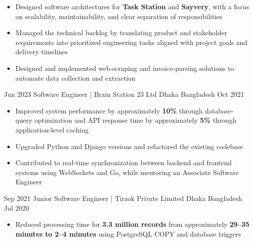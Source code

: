 \begin{experiences}
{\begin{itemize}
                \item Designed software architectures for \textbf{Task Station} and \textbf{Sayvery}, 
                      with a focus on scalability, maintainability, and clear separation of responsibilities

                \item Managed the technical backlog by translating product and
                      stakeholder requirements into prioritized engineering tasks
                      aligned with project goals and delivery timelines

                \item Designed and implemented web-scraping and invoice-parsing
                      solutions to automate data collection and extraction
            \end{itemize}
        }
        {}

    \emptySeparator


    \experience
        {Jun 2023}
        {Software Engineer | Brain Station 23 Ltd}
        {Dhaka}
        {Bangladesh}
        {Oct 2021}
        {
            \begin{itemize}
                \item Improved system performance by approximately \textbf{10\%} through
                      database-query optimization and API response time by approximately
                      \textbf{5\%} through application-level caching

                \item Upgraded Python and Django versions and refactored the existing codebase

                \item Contributed to real-time synchronization between backend
                      and frontend systems using WebSockets and Go, while mentoring
                      an Associate Software Engineer
            \end{itemize}
        }
        {}

    \emptySeparator

    \experience
        {Sep 2021}
        {Junior Software Engineer | Tirzok Private Limited}
        {Dhaka}
        {Bangladesh}
        {Jul 2020}
        {
            \begin{itemize}
                \item Reduced processing time for \textbf{3.3 million records}
                      from approximately \textbf{29--35 minutes to 2--4 minutes}
                      using PostgreSQL COPY and database triggers


\end{itemize}}
\end{experiences}
